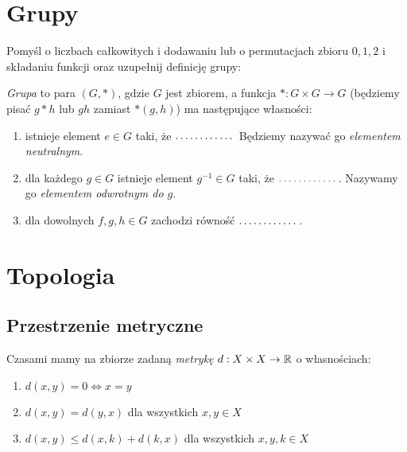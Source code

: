 \section{Grupy}

\begin{prob}
  Pomyśl o liczbach całkowitych i dodawaniu lub o permutacjach zbioru ${0,1,2}$ i składaniu funkcji oraz uzupełnij definicję grupy:

  \emph{Grupa} to para $(G, *)$, gdzie $G$ jest zbiorem, a funkcja $*: G\times G\to G$ (będziemy pisać $g*h$ lub $gh$ zamiast $*(g,h)$) ma następujące własności:
  \begin{enumerate}
    \item istnieje element $e\in G$ taki, że $\dots\dots\dots\dots$ Będziemy nazywać go \emph{elementem neutralnym}.
    \item dla każdego $g\in G$ istnieje element $g^{-1}\in G$ taki, że $\dots\dots\dots\dots$. Nazywamy go
      \emph{elementem odwrotnym do $g$}.
      \item dla dowolnych $f, g, h\in G$ zachodzi równość $\dots\dots\dots\dots$.
    \end{enumerate}
\end{prob}

\vspace{-1cm}




\section{Topologia}
\subsection{Przestrzenie metryczne}
Czasami mamy na zbiorze zadaną \emph{metrykę} $d:X\times X\to \mathbb{R}$ o własnościach:

\begin{enumerate}
  \item $d(x,y)=0\Leftrightarrow x=y$
  \item $d(x,y)=d(y,x)$ dla wszystkich $x,y\in X$
  \item $d(x,y) \le d(x,k) + d(k, x)$ dla wszystkich $x,y,k\in X$
\end{enumerate}

